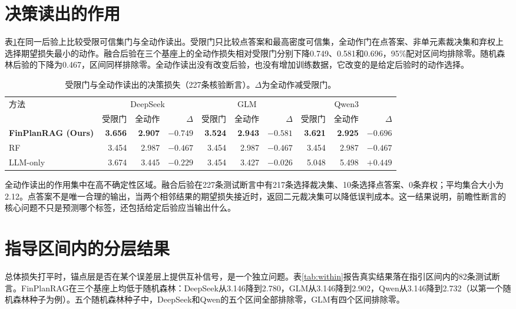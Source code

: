 \section{决策读出的作用}

表\ref{tab:readout}在同一后验上比较受限可信集门与全动作读出。受限门只比较点答案和最高密度可信集，全动作门在点答案、非单元素裁决集和弃权上选择期望损失最小的动作。融合后验在三个基座上的全动作损失相对受限门分别下降0.749、0.581和0.696，95\%配对区间均排除零。随机森林后验的下降为0.467，区间同样排除零。全动作读出没有改变后验，也没有增加训练数据，它改变的是给定后验时的动作选择。

\begin{table}[htbp]
\centering
{}
\setlength{\tabcolsep}{2.5pt}
\caption{受限门与全动作读出的决策损失（227条核验断言）。$\Delta$为全动作减受限门。}
\label{tab:readout}
\begin{tabular}{lrrrrrrrrr}
\toprule
\multirow{2}{*}{方法} & \multicolumn{3}{c}{DeepSeek} & \multicolumn{3}{c}{GLM} & \multicolumn{3}{c}{Qwen3} \\
\cmidrule(lr){2-4}\cmidrule(lr){5-7}\cmidrule(lr){8-10}
 & 受限门 & 全动作 & $\Delta$ & 受限门 & 全动作 & $\Delta$ & 受限门 & 全动作 & $\Delta$ \\
\midrule
\textbf{FinPlanRAG (Ours)} & \textbf{3.656} & \textbf{2.907} & \textbf{$-0.749$} & \textbf{3.524} & \textbf{2.943} & \textbf{$-0.581$} & \textbf{3.621} & \textbf{2.925} & \textbf{$-0.696$} \\
RF & 3.454 & 2.987 & $-0.467$ & 3.454 & 2.987 & $-0.467$ & 3.454 & 2.987 & $-0.467$ \\
LLM-only & 3.674 & 3.445 & $-0.229$ & 3.454 & 3.427 & $-0.026$ & 5.048 & 5.498 & $+0.449$ \\
\bottomrule
\end{tabular}
\end{table}

全动作读出的作用集中在高不确定性区域。融合后验在227条测试断言中有217条选择裁决集、10条选择点答案、0条弃权；平均集合大小为2.12。点答案不是唯一合理的输出，当两个相邻结果的期望损失接近时，返回二元裁决集可以降低误判成本。这一结果说明，前瞻性断言的核心问题不只是预测哪个标签，还包括给定后验应当输出什么。

\section{指导区间内的分层结果}
\label{sec:within}

总体损失打平时，锚点层是否在某个误差层上提供互补信号，是一个独立问题。表\ref{tab:within}报告真实结果落在指引区间内的82条测试断言。FinPlanRAG在三个基座上均低于随机森林：DeepSeek从3.146降到2.780，GLM从3.146降到2.902，Qwen从3.146降到2.732（以第一个随机森林种子为例）。五个随机森林种子中，DeepSeek和Qwen的五个区间全部排除零，GLM有四个区间排除零。

